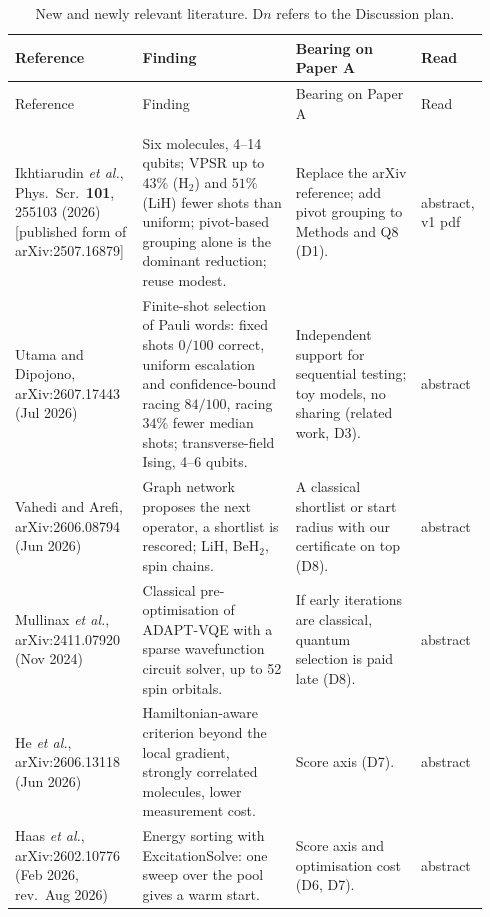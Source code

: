 \documentclass[11pt]{article}
\begin{document}
\begingroup\footnotesize
\setlength{\tabcolsep}{3pt}
\begin{longtable}{>{\raggedright\arraybackslash}p{0.27\linewidth}>{\raggedright\arraybackslash}p{0.33\linewidth}>{\raggedright\arraybackslash}p{0.27\linewidth}>{\raggedright\arraybackslash}p{0.07\linewidth}}
\caption{New and newly relevant literature. D$n$ refers to the Discussion plan.\label{tab:lit}}\\
\toprule
Reference & Finding & Bearing on Paper A & Read \\
\midrule
\endfirsthead
\toprule
Reference & Finding & Bearing on Paper A & Read \\
\midrule
\endhead
\multicolumn{4}{l}{\emph{Selection and measurement}} \\
Ikhtiarudin \emph{et al.}, Phys.\ Scr.\ \textbf{101}, 255103 (2026) [published form of arXiv:2507.16879] & Six molecules, 4--14 qubits; VPSR up to $43\%$ (H$_2$) and $51\%$ (LiH) fewer shots than uniform; pivot-based grouping alone is the dominant reduction; reuse modest. & Replace the arXiv reference; add pivot grouping to Methods and Q8 (D1). & abstract, v1 pdf \\
Utama and Dipojono, arXiv:2607.17443 (Jul 2026) & Finite-shot selection of Pauli words: fixed shots $0/100$ correct, uniform escalation and confidence-bound racing $84/100$, racing $34\%$ fewer median shots; transverse-field Ising, 4--6 qubits. & Independent support for sequential testing; toy models, no sharing (related work, D3). & abstract \\
Vahedi and Arefi, arXiv:2606.08794 (Jun 2026) & Graph network proposes the next operator, a shortlist is rescored; LiH, BeH$_2$, spin chains. & A classical shortlist or start radius with our certificate on top (D8). & abstract \\
Mullinax \emph{et al.}, arXiv:2411.07920 (Nov 2024) & Classical pre-optimisation of ADAPT-VQE with a sparse wavefunction circuit solver, up to 52 spin orbitals. & If early iterations are classical, quantum selection is paid late (D8). & abstract \\
He \emph{et al.}, arXiv:2606.13118 (Jun 2026) & Hamiltonian-aware criterion beyond the local gradient, strongly correlated molecules, lower measurement cost. & Score axis (D7). & abstract \\
Haas \emph{et al.}, arXiv:2602.10776 (Feb 2026, rev.\ Aug 2026) & Energy sorting with ExcitationSolve: one sweep over the pool gives a warm start. & Score axis and optimisation cost (D6, D7). & abstract \\

\end{longtable}
\end{document}
